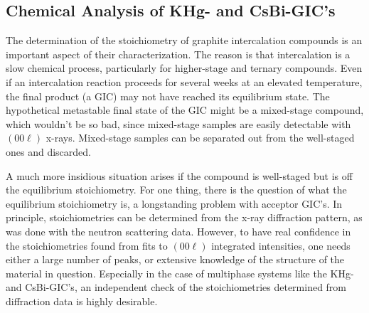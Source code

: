\subsection{Chemical Analysis of KHg- and CsBi-GIC's}
\label{chemanal}

        The determination  of  the stoichiometry of  graphite intercalation
compounds is an important aspect  of their characterization.  The reason is
that     intercalation  is a  slow    chemical  process,   particularly for
higher-stage and   ternary  compounds.  Even   if an intercalation reaction
proceeds for several weeks at an elevated temperature, the final product (a
GIC)  may  not  have reached   its   equilibrium  state.  The  hypothetical
metastable final state  of the GIC  might be a mixed-stage  compound, which
wouldn't  be so bad, since mixed-stage   samples are easily detectable with
$(00\ell)$ x-rays.    Mixed-stage samples  can be  separated  out  from the
well-staged ones and discarded.

        A  much   more  insidious   situation arises   if  the  compound is
well-staged but is off the equilibrium stoichiometry.  For one thing, there
is  the  question of what the  equilibrium stoichiometry is, a longstanding
problem with acceptor GIC's.\cite{C159} In principle, stoichiometries can be
determined from the x-ray diffraction pattern, as was done with the neutron
scattering data.  However, to have real  confidence in  the stoichiometries
found from fits  to $(00\ell)$  integrated intensities, one needs  either a
large number  of  peaks, or extensive  knowledge of  the  structure  of the
material in question.  Especially in  the case  of  multiphase systems like
the KHg-  and  CsBi-GIC's, an independent     check of  the  stoichiometries
determined from diffraction data is highly desirable.

